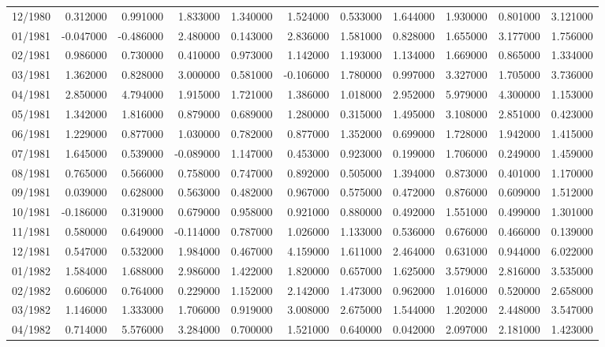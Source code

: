 \begin{tabular}{lrrrrrrrrrr}
12/1980 & 0.312000 & 0.991000 & 1.833000 & 1.340000 & 1.524000 & 0.533000 & 1.644000 & 1.930000 & 0.801000 & 3.121000 \\
01/1981 & -0.047000 & -0.486000 & 2.480000 & 0.143000 & 2.836000 & 1.581000 & 0.828000 & 1.655000 & 3.177000 & 1.756000 \\
02/1981 & 0.986000 & 0.730000 & 0.410000 & 0.973000 & 1.142000 & 1.193000 & 1.134000 & 1.669000 & 0.865000 & 1.334000 \\
03/1981 & 1.362000 & 0.828000 & 3.000000 & 0.581000 & -0.106000 & 1.780000 & 0.997000 & 3.327000 & 1.705000 & 3.736000 \\
04/1981 & 2.850000 & 4.794000 & 1.915000 & 1.721000 & 1.386000 & 1.018000 & 2.952000 & 5.979000 & 4.300000 & 1.153000 \\
05/1981 & 1.342000 & 1.816000 & 0.879000 & 0.689000 & 1.280000 & 0.315000 & 1.495000 & 3.108000 & 2.851000 & 0.423000 \\
06/1981 & 1.229000 & 0.877000 & 1.030000 & 0.782000 & 0.877000 & 1.352000 & 0.699000 & 1.728000 & 1.942000 & 1.415000 \\
07/1981 & 1.645000 & 0.539000 & -0.089000 & 1.147000 & 0.453000 & 0.923000 & 0.199000 & 1.706000 & 0.249000 & 1.459000 \\
08/1981 & 0.765000 & 0.566000 & 0.758000 & 0.747000 & 0.892000 & 0.505000 & 1.394000 & 0.873000 & 0.401000 & 1.170000 \\
09/1981 & 0.039000 & 0.628000 & 0.563000 & 0.482000 & 0.967000 & 0.575000 & 0.472000 & 0.876000 & 0.609000 & 1.512000 \\
10/1981 & -0.186000 & 0.319000 & 0.679000 & 0.958000 & 0.921000 & 0.880000 & 0.492000 & 1.551000 & 0.499000 & 1.301000 \\
11/1981 & 0.580000 & 0.649000 & -0.114000 & 0.787000 & 1.026000 & 1.133000 & 0.536000 & 0.676000 & 0.466000 & 0.139000 \\
12/1981 & 0.547000 & 0.532000 & 1.984000 & 0.467000 & 4.159000 & 1.611000 & 2.464000 & 0.631000 & 0.944000 & 6.022000 \\
01/1982 & 1.584000 & 1.688000 & 2.986000 & 1.422000 & 1.820000 & 0.657000 & 1.625000 & 3.579000 & 2.816000 & 3.535000 \\
02/1982 & 0.606000 & 0.764000 & 0.229000 & 1.152000 & 2.142000 & 1.473000 & 0.962000 & 1.016000 & 0.520000 & 2.658000 \\
03/1982 & 1.146000 & 1.333000 & 1.706000 & 0.919000 & 3.008000 & 2.675000 & 1.544000 & 1.202000 & 2.448000 & 3.547000 \\
04/1982 & 0.714000 & 5.576000 & 3.284000 & 0.700000 & 1.521000 & 0.640000 & 0.042000 & 2.097000 & 2.181000 & 1.423000 \\

\end{tabular}
